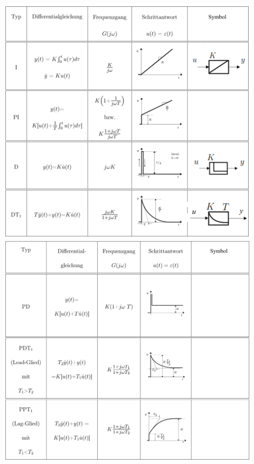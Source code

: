 		\includegraphics[width=13.5 cm]{./bilder/grundglieder/glieder3.png} \\
		\includegraphics[width=13.5 cm]{./bilder/grundglieder/glieder4.png} \\
